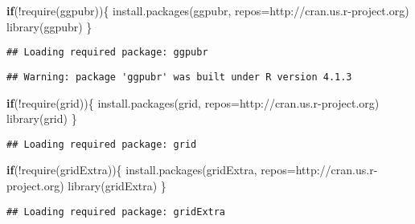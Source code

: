 \documentclass[
]{article}
\newenvironment{Shaded}{\begin{snugshade}}{\end{snugshade}}
\newcommand{\AttributeTok}[1]{\textcolor[rgb]{0.77,0.63,0.00}{#1}}
\newcommand{\ControlFlowTok}[1]{\textcolor[rgb]{0.13,0.29,0.53}{\textbf{#1}}}
\newcommand{\FunctionTok}[1]{\textcolor[rgb]{0.00,0.00,0.00}{#1}}
\newcommand{\NormalTok}[1]{#1}
\newcommand{\SpecialCharTok}[1]{\textcolor[rgb]{0.00,0.00,0.00}{#1}}
\newcommand{\StringTok}[1]{\textcolor[rgb]{0.31,0.60,0.02}{#1}}
\begin{document}
\begin{Shaded}
\begin{Highlighting}[]
\ControlFlowTok{if}\NormalTok{(}\SpecialCharTok{!}\FunctionTok{require}\NormalTok{(ggpubr))\{}
    \FunctionTok{install.packages}\NormalTok{(}\StringTok{\textquotesingle{}ggpubr\textquotesingle{}}\NormalTok{, }\AttributeTok{repos=}\StringTok{\textquotesingle{}http://cran.us.r{-}project.org\textquotesingle{}}\NormalTok{)}
    \FunctionTok{library}\NormalTok{(ggpubr)}
\NormalTok{\}}
\end{Highlighting}
\end{Shaded}

\begin{verbatim}
## Loading required package: ggpubr
\end{verbatim}

\begin{verbatim}
## Warning: package 'ggpubr' was built under R version 4.1.3
\end{verbatim}

\begin{Shaded}
\begin{Highlighting}[]
\ControlFlowTok{if}\NormalTok{(}\SpecialCharTok{!}\FunctionTok{require}\NormalTok{(grid))\{}
    \FunctionTok{install.packages}\NormalTok{(}\StringTok{\textquotesingle{}grid\textquotesingle{}}\NormalTok{, }\AttributeTok{repos=}\StringTok{\textquotesingle{}http://cran.us.r{-}project.org\textquotesingle{}}\NormalTok{)}
    \FunctionTok{library}\NormalTok{(grid)}
\NormalTok{\}}
\end{Highlighting}
\end{Shaded}

\begin{verbatim}
## Loading required package: grid
\end{verbatim}

\begin{Shaded}
\begin{Highlighting}[]
\ControlFlowTok{if}\NormalTok{(}\SpecialCharTok{!}\FunctionTok{require}\NormalTok{(gridExtra))\{}
    \FunctionTok{install.packages}\NormalTok{(}\StringTok{\textquotesingle{}gridExtra\textquotesingle{}}\NormalTok{, }\AttributeTok{repos=}\StringTok{\textquotesingle{}http://cran.us.r{-}project.org\textquotesingle{}}\NormalTok{)}
    \FunctionTok{library}\NormalTok{(gridExtra)}
\NormalTok{\}}
\end{Highlighting}
\end{Shaded}

\begin{verbatim}
## Loading required package: gridExtra
\end{verbatim}
\end{document}
